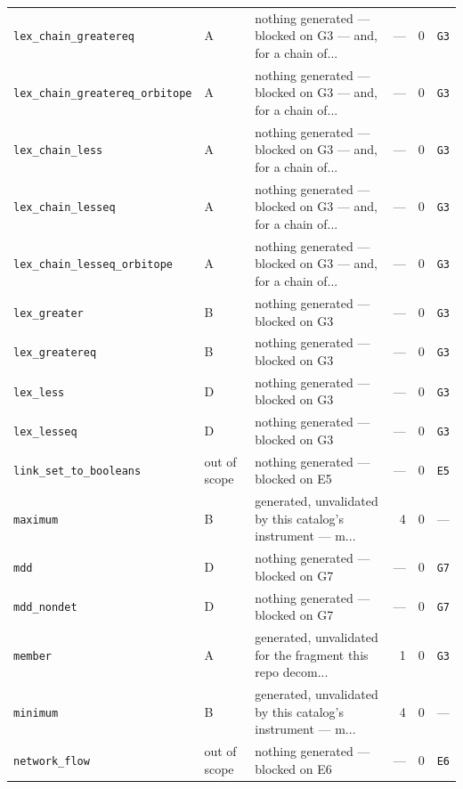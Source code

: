 \documentclass[10pt,a4paper]{article}
\begin{document}
\begin{longtable}{@{}>{\raggedright\arraybackslash}p{}l>{\raggedright\arraybackslash}p{}rrl@{}}
\texttt{lex\_\allowbreak{}chain\_\allowbreak{}greatereq} & A & nothing generated --- blocked on G3 --- and, for a chain of... & --- & 0 & \texttt{G3} \\
\texttt{lex\_\allowbreak{}chain\_\allowbreak{}greatereq\_\allowbreak{}orbitope} & A & nothing generated --- blocked on G3 --- and, for a chain of... & --- & 0 & \texttt{G3} \\
\texttt{lex\_\allowbreak{}chain\_\allowbreak{}less} & A & nothing generated --- blocked on G3 --- and, for a chain of... & --- & 0 & \texttt{G3} \\
\texttt{lex\_\allowbreak{}chain\_\allowbreak{}lesseq} & A & nothing generated --- blocked on G3 --- and, for a chain of... & --- & 0 & \texttt{G3} \\
\texttt{lex\_\allowbreak{}chain\_\allowbreak{}lesseq\_\allowbreak{}orbitope} & A & nothing generated --- blocked on G3 --- and, for a chain of... & --- & 0 & \texttt{G3} \\
\texttt{lex\_\allowbreak{}greater} & B & nothing generated --- blocked on G3 & --- & 0 & \texttt{G3} \\
\texttt{lex\_\allowbreak{}greatereq} & B & nothing generated --- blocked on G3 & --- & 0 & \texttt{G3} \\
\texttt{lex\_\allowbreak{}less} & D & nothing generated --- blocked on G3 & --- & 0 & \texttt{G3} \\
\texttt{lex\_\allowbreak{}lesseq} & D & nothing generated --- blocked on G3 & --- & 0 & \texttt{G3} \\
\texttt{link\_\allowbreak{}set\_\allowbreak{}to\_\allowbreak{}booleans} & out of scope & nothing generated --- blocked on E5 & --- & 0 & \texttt{E5} \\
\texttt{maximum} & B & generated, unvalidated by this catalog's instrument --- m... & 4 & 0 & --- \\
\texttt{mdd} & D & nothing generated --- blocked on G7 & --- & 0 & \texttt{G7} \\
\texttt{mdd\_\allowbreak{}nondet} & D & nothing generated --- blocked on G7 & --- & 0 & \texttt{G7} \\
\texttt{member} & A & generated, unvalidated for the fragment this repo decom... & 1 & 0 & \texttt{G3} \\
\texttt{minimum} & B & generated, unvalidated by this catalog's instrument --- m... & 4 & 0 & --- \\
\texttt{network\_\allowbreak{}flow} & out of scope & nothing generated --- blocked on E6 & --- & 0 & \texttt{E6} \\

\end{longtable}
\end{document}
